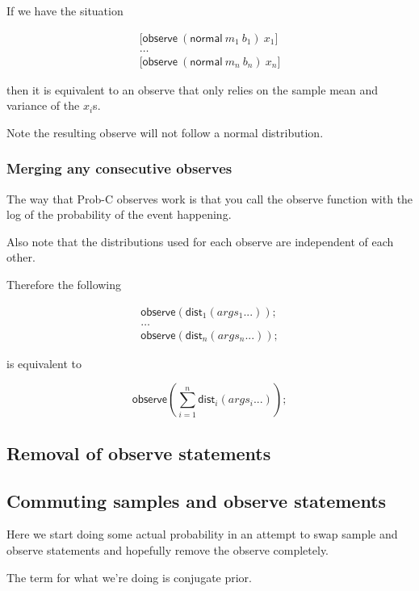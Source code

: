 \documentclass[a4paper]{article}
\begin{document}
If we have the situation

\[
	\begin{array}{l}
		\lbrack \mathsf{observe}\ (\mathsf{normal}\ m_1\ b_1)\ x_1 \rbrack \\
		\dots \\
		\lbrack \mathsf{observe}\ (\mathsf{normal}\ m_n\ b_n)\ x_n \rbrack
	\end{array}
\]

then it is equivalent to an observe that only relies on the sample mean and variance of the \(x_i\)s.

Note the resulting observe will not follow a normal distribution.



\subsubsection{Merging any consecutive observes}

The way that Prob-C observes work is that you call the observe function with the log of the probability of the event happening.

Also note that the distributions used for each observe are independent of each other.

Therefore the following

\[
	\begin{array}{l}
		\mathsf{observe}(\mathsf{dist}_1(args_1 ...)); \\
		\dots \\
		\mathsf{observe}(\mathsf{dist}_n(args_n ...));
	\end{array}
\]

is equivalent to

\[\mathsf{observe}(\sum_{i=1}^n\mathsf{dist}_i(args_i ...));\]



\subsection{Removal of observe statements}

\subsection{Commuting samples and observe statements}

Here we start doing some actual probability in an attempt to swap sample and observe statements and hopefully remove the observe completely.

The term for what we're doing is conjugate prior.
\end{document}
